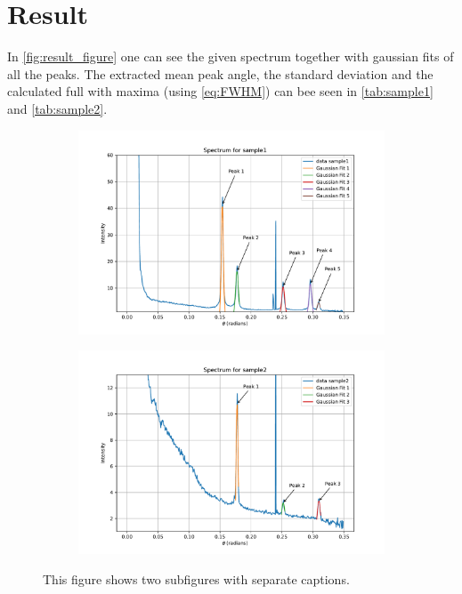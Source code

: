 \newpage
\section{Result}

In \autoref{fig:result_figure} one can see the given spectrum together with gaussian fits of all the peaks. The extracted mean peak angle, the standard deviation and the calculated full with maxima (using \autoref{eq:FWHM}) can bee seen in \autoref{tab:sample1} and \autoref{tab:sample2}. 

\begin{figure}[H]
    \centering
    \begin{subfigure}[b]{0.89\textwidth} 
        \includegraphics[width=\textwidth]{Figures/gaussian_sample1.pdf}
        \label{fig:subfigure1}
    \end{subfigure}
    \begin{subfigure}[b]{0.89\textwidth} 
        \includegraphics[width=\textwidth]{Figures/gaussian_sample2.pdf}
        \label{fig:subfigure2}
    \end{subfigure}
    \caption{This figure shows two subfigures with separate captions.}
    \label{fig:result_figure}
\end{figure}

